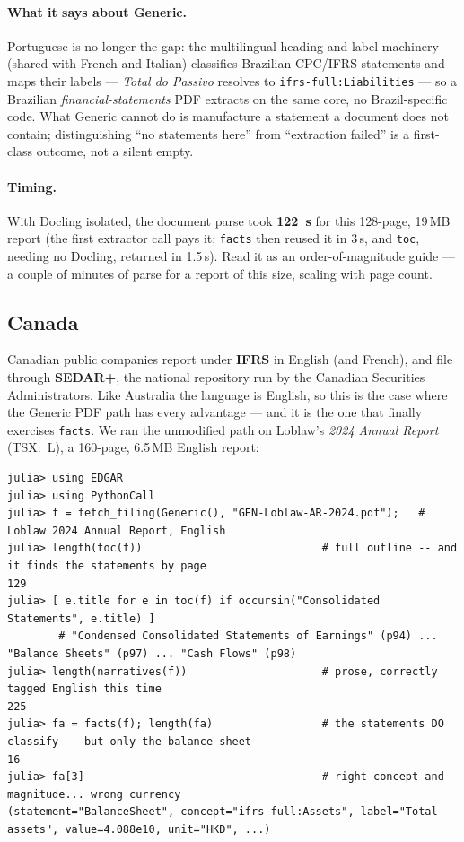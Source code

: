 \documentclass[11pt,a4paper]{report}
\begin{document}
\paragraph{What it says about Generic.} Portuguese is no longer the gap: the multilingual heading-and-label
machinery (shared with French and Italian) classifies Brazilian CPC/IFRS statements and maps their labels ---
\emph{Total do Passivo} resolves to \texttt{ifrs-full:Liabilities} --- so a Brazilian \emph{financial-statements}
PDF extracts on the same core, no Brazil-specific code. What Generic cannot do is manufacture a statement a
document does not contain; distinguishing ``no statements here'' from ``extraction failed'' is a first-class
outcome, not a silent empty.

\paragraph{Timing.} With Docling isolated, the document parse took \textbf{122~s} for this 128-page, 19\,MB
report (the first extractor call pays it; \texttt{facts} then reused it in 3\,s, and \texttt{toc}, needing no
Docling, returned in 1.5\,s). Read it as an order-of-magnitude guide --- a couple of minutes of parse for a
report of this size, scaling with page count.

\subsection{Canada}
\label{sec:generic-canada}

Canadian public companies report under \textbf{IFRS} in English (and French), and file through \textbf{SEDAR+},
the national repository run by the Canadian Securities Administrators. Like Australia the language is English,
so this is the case where the Generic PDF path has every advantage --- and it is the one that finally exercises
\texttt{facts}. We ran the unmodified path on Loblaw's \emph{2024 Annual Report} (TSX:~L), a 160-page, 6.5\,MB
English report:

\begin{lstlisting}
julia> using EDGAR
julia> using PythonCall
julia> f = fetch_filing(Generic(), "GEN-Loblaw-AR-2024.pdf");   # Loblaw 2024 Annual Report, English
julia> length(toc(f))                            # full outline -- and it finds the statements by page
129
julia> [ e.title for e in toc(f) if occursin("Consolidated Statements", e.title) ]
        # "Condensed Consolidated Statements of Earnings" (p94) ... "Balance Sheets" (p97) ... "Cash Flows" (p98)
julia> length(narratives(f))                     # prose, correctly tagged English this time
225
julia> fa = facts(f); length(fa)                 # the statements DO classify -- but only the balance sheet
16
julia> fa[3]                                     # right concept and magnitude... wrong currency
(statement="BalanceSheet", concept="ifrs-full:Assets", label="Total assets", value=4.088e10, unit="HKD", ...)
\end{lstlisting}
\end{document}
